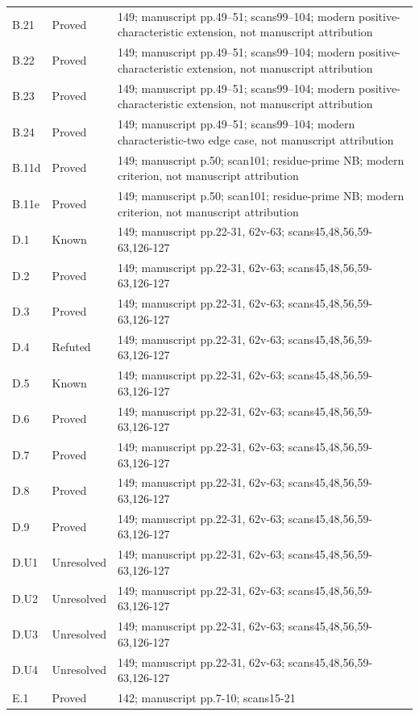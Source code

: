 {\begin{longtable}{p{1.9cm}p{1.7cm}p{10.3cm}}
B.21 & Proved & 149; manuscript pp.49–51; scans99–104; modern positive-characteristic extension, not manuscript attribution \\
B.22 & Proved & 149; manuscript pp.49–51; scans99–104; modern positive-characteristic extension, not manuscript attribution \\
B.23 & Proved & 149; manuscript pp.49–51; scans99–104; modern positive-characteristic extension, not manuscript attribution \\
B.24 & Proved & 149; manuscript pp.49–51; scans99–104; modern characteristic-two edge case, not manuscript attribution \\
B.11d & Proved & 149; manuscript p.50; scan101; residue-prime NB; modern criterion, not manuscript attribution \\
B.11e & Proved & 149; manuscript p.50; scan101; residue-prime NB; modern criterion, not manuscript attribution \\
D.1 & Known & 149; manuscript pp.22-31, 62v-63; scans45,48,56,59-63,126-127 \\
D.2 & Proved & 149; manuscript pp.22-31, 62v-63; scans45,48,56,59-63,126-127 \\
D.3 & Proved & 149; manuscript pp.22-31, 62v-63; scans45,48,56,59-63,126-127 \\
D.4 & Refuted & 149; manuscript pp.22-31, 62v-63; scans45,48,56,59-63,126-127 \\
D.5 & Known & 149; manuscript pp.22-31, 62v-63; scans45,48,56,59-63,126-127 \\
D.6 & Proved & 149; manuscript pp.22-31, 62v-63; scans45,48,56,59-63,126-127 \\
D.7 & Proved & 149; manuscript pp.22-31, 62v-63; scans45,48,56,59-63,126-127 \\
D.8 & Proved & 149; manuscript pp.22-31, 62v-63; scans45,48,56,59-63,126-127 \\
D.9 & Proved & 149; manuscript pp.22-31, 62v-63; scans45,48,56,59-63,126-127 \\
D.U1 & Unresolved & 149; manuscript pp.22-31, 62v-63; scans45,48,56,59-63,126-127 \\
D.U2 & Unresolved & 149; manuscript pp.22-31, 62v-63; scans45,48,56,59-63,126-127 \\
D.U3 & Unresolved & 149; manuscript pp.22-31, 62v-63; scans45,48,56,59-63,126-127 \\
D.U4 & Unresolved & 149; manuscript pp.22-31, 62v-63; scans45,48,56,59-63,126-127 \\
E.1 & Proved & 142; manuscript pp.7-10; scans15-21 \\

\end{longtable}}
